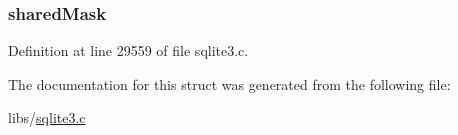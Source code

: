 \subsubsection[{shared\+Mask}]{ shared\+Mask}\label{structunix_shm_a7d537c771564d6de1ec27040e9bac2a6}


Definition at line 29559 of file sqlite3.\+c.



The documentation for this struct was generated from the following file\+:\begin{DoxyCompactItemize}
\item 
libs/\hyperlink{sqlite3_8c}{sqlite3.\+c}\end{DoxyCompactItemize}
